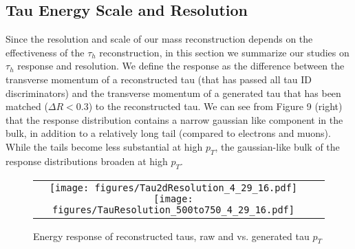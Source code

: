 \subsection{Tau Energy Scale and Resolution}

Since the resolution and scale of our mass reconstruction depends on the effectiveness of the $\tau_{h}$ reconstruction, in this section we summarize our studies on $\tau_{h}$ response and resolution. We define the response as the difference between the transverse momentum of a reconstructed tau (that has passed all tau ID discriminators) and the transverse momentum of a generated tau that has been matched ($\Delta R < 0.3$) to the reconstructed tau. We can see from Figure 9 (right) that the response distribution contains a narrow gaussian like component in the bulk, in addition to a relatively long tail (compared to electrons and muons). While the tails become less substantial at high $p_{T}$, the gaussian-like bulk of the response distributions broaden at high $p_{T}$.
 
\begin{figure}[tbh!]
  \centering
  \begin{tabular}{cc}
  \texttt{[image: figures/Tau2dResolution\_4\_29\_16.pdf]}
  \texttt{[image: figures/TauResolution\_500to750\_4\_29\_16.pdf]}
  \end{tabular}
  \caption{Energy response of reconstructed taus, raw and vs. generated tau $p_{T}$}
  \label{fig:Tau2dResolution}
\end{figure}


